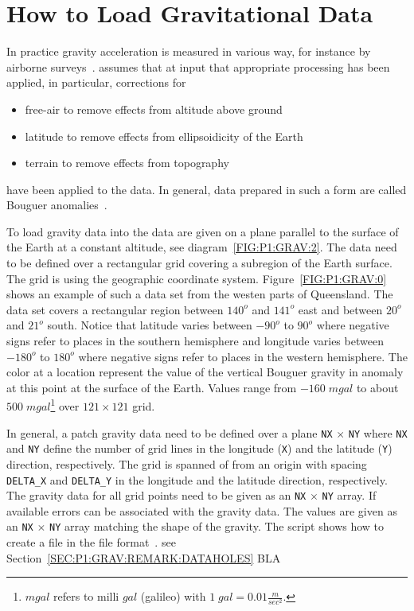 \section{How to Load Gravitational Data}\label{SEC:P1:GRAV:DATA}
In practice gravity acceleration is measured in various way, for instance by airborne surveys~\cite{Telford1990a}. \downunder
assumes that at input that appropriate processing has been applied,  
in particular, corrections for  
\begin{itemize}
 \item free-air to remove effects from altitude above ground 
 \item latitude to remove effects from ellipsoidicity of the Earth  
 \item terrain to remove effects from topography  
\end{itemize}
have been applied to the data. In general, data prepared in such a form are called Bouguer anomalies~\cite{Telford1990a}. 

To load gravity data into  \downunder the data are given on a plane parallel to the surface of the Earth at a constant
altitude, see diagram~\ref{FIG:P1:GRAV:2}. The data need to be defined over a rectangular grid covering a subregion of 
the Earth surface. 
The grid is using the geographic coordinate system. Figure~\ref{FIG:P1:GRAV:0} shows an example of such a data set
from the westen parts of Queensland. The data set covers a rectangular region between $140^o$ and $141^o$ east 
and between $20^o$ and $21^o$ south. Notice that latitude varies between $-90^o$ to $90^o$ where
negative signs refer to places in the southern hemisphere and
longitude varies between $-180^o$ to $180^o$ where
negative signs refer to places in the western hemisphere.
The color at a location represent the value of the vertical Bouguer gravity in  anomaly at this point at the surface of the Earth.
Values range from $-160  \;  mgal$ to about $500 \; mgal$\footnote{$mgal$ refers to milli $gal$ (galileo) with 
$1 \;  gal = 0.01 \frac{m}{sec^2}$.} over $121 \times 121$ grid.

In general, a patch gravity data need to be defined over a plane \verb|NX| $\times$ \verb|NY| where 
\verb|NX|  and \verb|NY|  define the number of grid lines in the longitude (\verb|X|) and the latitude (\verb|Y|) 
direction, respectively. The grid is spanned of from an origin with spacing
\verb|DELTA_X| and \verb|DELTA_Y| in the longitude and the latitude direction, respectively. 
The gravity data for all grid points need to be given as an \verb|NX| $\times$ \verb|NY| array.  
If available errors can be associated with the gravity data. The values are given as an \verb|NX| $\times$ \verb|NY| array
matching the shape of the gravity. 
The \python script  shows how to create a file in the \netcdf file format~\cite{NETCDF}.
see Section~\ref{SEC:P1:GRAV:REMARK:DATAHOLES}
BLA 

